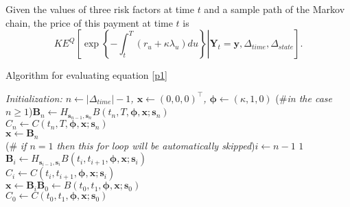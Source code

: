 \documentclass[11pt]{article}
\numberwithin{equation}{section}
\begin{document}
Given the values of three risk factors at time $t$ and a sample path of the
Markov chain, the price of this payment at time $t$ is%
\begin{equation}
KE^{Q}\left[ \left. \exp \left\{ -\int_{t}^{T}\left( r_{u}+\kappa \lambda
_{u}\right) du\right\} \right\vert \mathbf{Y}_{t}=\mathbf{y},\Delta
_{time},\Delta _{state}\right] .  \label{p1}
\end{equation}%
\begin{algorithm}
	
	\caption{Algorithm for evaluating equation \ref{p1}}
	\BlankLine
	\emph{Initialization: $n \leftarrow \left| \Delta
		_{time} \right|-1 $, $\mathbf{x}\leftarrow \left(0,0,0 \right)^\intercal $, $\boldsymbol{\phi}\leftarrow \left(\kappa,1,0 \right) $ }
	\BlankLine
	(\#\textit{in the case $n \geq 1$}){$\mathbf{B}_{n} \leftarrow H_{\mathbf{s}_{n-1},\mathbf{s}_{n}}B\left(t_n,T,\boldsymbol{\phi}, \mathbf{x};\mathbf{s}_n \right) $\\$C_n\leftarrow C\left(t_n,T,\boldsymbol{\phi}, \mathbf{x};\mathbf{s}_n \right) $\\$\mathbf{x}\leftarrow \mathbf{B}_n$\\ \For(\# \textit{if $n=1$ then this for loop will be automatically skipped}){$i\leftarrow $$n-1$ \KwTo $1$}{$\mathbf{B}_i \leftarrow H_{\mathbf{s}_{i-1},\mathbf{s}_{i}}   B\left(t_i,t_{i+1},\boldsymbol{\phi}, \mathbf{x};\mathbf{s}_i \right) $\\$C_i\leftarrow C\left(t_i,t_{i+1},\boldsymbol{\phi}, \mathbf{x};\mathbf{s}_i \right) $\\ $\mathbf{x}\leftarrow \mathbf{B}_i$}$\mathbf{B}_0 \leftarrow B\left(t_0,t_1,\boldsymbol{\phi}, \mathbf{x};\mathbf{s}_0 \right) $\\$C_0\leftarrow C\left(t_0,t_1,\boldsymbol{\phi}, \mathbf{x};\mathbf{s}_0 \right) $ \\}
	
	
	
	
	\label{algo:p1}
\end{algorithm}
\end{document}
